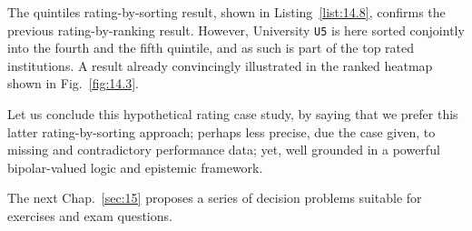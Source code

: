 The quintiles rating-by-sorting result, shown in Listing~\vref{list:14.8}, confirms the previous \Copeland rating-by-ranking result. However, University \texttt{U5} is here sorted conjointly into the fourth and the fifth quintile, and as such is part of the top rated institutions. A result already convincingly illustrated in the ranked heatmap shown in Fig.~\vref{fig:14.3}.

Let us conclude this hypothetical rating case study, by saying that we prefer this latter rating-by-sorting approach; perhaps less precise, due the case given, to missing and contradictory performance data; yet, well grounded in a powerful bipolar-valued logic and epistemic framework.

\vspace{\baselineskip}
 The next Chap.~\ref{sec:15} proposes a series of decision problems suitable for exercises and exam questions.
 

%
%
